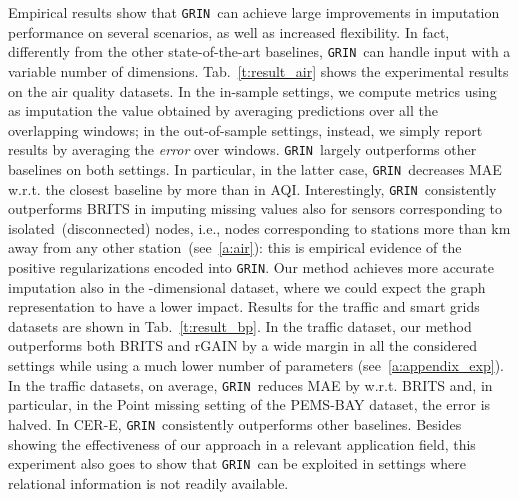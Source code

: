 \documentclass{article} \usepackage{iclr2022_conference,times}
\newcommand{\GRIL}{\texttt{GRIN}}
\begin{document}
Empirical results show that \GRIL\ can achieve large improvements in imputation performance on several scenarios, as well as increased flexibility. In fact, differently from the other state-of-the-art baselines, \GRIL\ can handle input with a variable number of dimensions.
Tab.~\ref{t:result_air} shows the experimental results on the air quality datasets. In the in-sample settings, we compute metrics using as imputation the value obtained by averaging predictions over all the overlapping windows; in the out-of-sample settings, instead, we simply report results by averaging the \emph{error} over windows. \GRIL\ largely outperforms other baselines on both settings. In particular, in the latter case, \GRIL\ decreases MAE w.r.t. the closest baseline by more than  in AQI. Interestingly, \GRIL\ consistently outperforms BRITS in imputing missing values also for sensors corresponding to isolated~(disconnected) nodes, i.e., nodes corresponding to stations more than  km away from any other station~(see~\ref{a:air}): this is empirical evidence of the positive regularizations encoded into \GRIL. Our method achieves more accurate imputation also in the -dimensional dataset, where we could expect the graph representation to have a lower impact. 
Results for the traffic and smart grids datasets are shown in Tab.~\ref{t:result_bp}. In the traffic dataset, our method outperforms both BRITS and rGAIN by a wide margin in all the considered settings while using a much lower number of parameters (see~\ref{a:appendix_exp}). In the traffic datasets, on average, \GRIL\ reduces MAE by  w.r.t. BRITS and, in particular, in the Point missing setting of the PEMS-BAY dataset, the error is halved. In CER-E, \GRIL\ consistently outperforms other baselines. Besides showing the effectiveness of our approach in a relevant application field, this experiment also goes to show that \GRIL\ can be exploited in settings where relational information is not readily available. 
\end{document}
